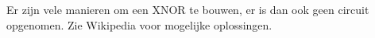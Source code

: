 Er zijn vele manieren om een XNOR te bouwen, er is dan ook geen circuit opgenomen. Zie Wikipedia voor mogelijke oplossingen.

